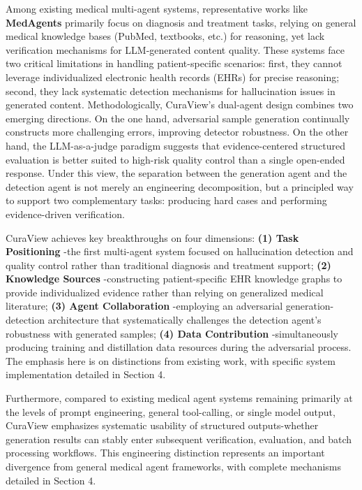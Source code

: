\documentclass[11pt]{article}
\begin{document}
Among existing medical multi-agent systems, representative works like \textbf{MedAgents} \citep{tang2023medAgents} primarily focus on diagnosis and treatment tasks, relying on general medical knowledge bases (PubMed, textbooks, etc.) for reasoning, yet lack verification mechanisms for LLM-generated content quality. These systems face two critical limitations in handling patient-specific scenarios: first, they cannot leverage individualized electronic health records (EHRs) for precise reasoning; second, they lack systematic detection mechanisms for hallucination issues in generated content. Methodologically, CuraView's dual-agent design combines two emerging directions. On the one hand, adversarial sample generation continually constructs more challenging errors, improving detector robustness. On the other hand, the LLM-as-a-judge paradigm suggests that evidence-centered structured evaluation is better suited to high-risk quality control than a single open-ended response. Under this view, the separation between the generation agent and the detection agent is not merely an engineering decomposition, but a principled way to support two complementary tasks: producing hard cases and performing evidence-driven verification.

CuraView achieves key breakthroughs on four dimensions: \textbf{(1) Task Positioning} -the first multi-agent system focused on hallucination detection and quality control rather than traditional diagnosis and treatment support; \textbf{(2) Knowledge Sources} -constructing patient-specific EHR knowledge graphs to provide individualized evidence rather than relying on generalized medical literature; \textbf{(3) Agent Collaboration} -employing an adversarial generation-detection architecture that systematically challenges the detection agent's robustness with generated samples; \textbf{(4) Data Contribution} -simultaneously producing training and distillation data resources during the adversarial process. The emphasis here is on distinctions from existing work, with specific system implementation detailed in Section 4.

Furthermore, compared to existing medical agent systems remaining primarily at the levels of prompt engineering, general tool-calling, or single model output, CuraView emphasizes systematic usability of structured outputs-whether generation results can stably enter subsequent verification, evaluation, and batch processing workflows. This engineering distinction represents an important divergence from general medical agent frameworks, with complete mechanisms detailed in Section 4.
\end{document}
